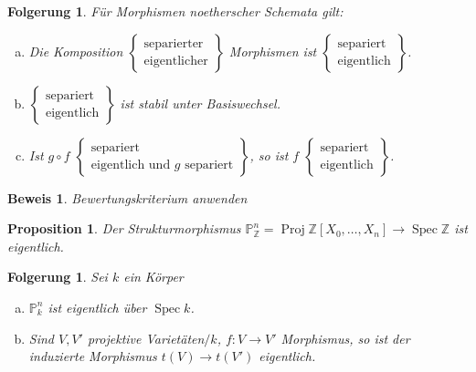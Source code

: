 \documentclass[paper = A4, fontsize=12pt, numbers=noendperiod, chapterprefix=true]{scrbook}
\theoremstyle{break}
\newtheorem{Prop}[Def]{Proposition}
\newtheorem{Folg}[Def]{Folgerung}
\theoremstyle{nonumberbreak}
\newtheorem{bew}{Beweis}
\theoremstyle{nonumberplain}
\DeclareMathOperator{\Proj}{Proj}
\DeclareMathOperator{\Spec}{Spec}
\newcommand{\Z}{\mathbb{Z}}
\newcommand{\IP}{\mathbb{P}}%
\begin{document}
\begin{Folg}\label{8.9}
F\"ur Morphismen noetherscher Schemata gilt:
\begin{enumerate}[a)]
\item\label{8.9a}
	Die Komposition $\left\{\begin{array}{c}\text{separierter}\\ \text{eigentlicher}\end{array}\right\}$ Morphismen ist $\left\{\begin{array}{c}\text{separiert}\\ \text{eigentlich}\end{array}\right\}$.
\item\label{8.9c}
	$\left\{\begin{array}{c}\text{separiert}\\ \text{eigentlich}\end{array}\right\}$ ist stabil unter Basiswechsel.
\item\label{8.9c}
	Ist $g \circ f$ $\left\{\begin{array}{c}\text{separiert}\\ \text{eigentlich und } g \text{ separiert}\end{array}\right\}$, so ist $f$ $\left\{\begin{array}{c}\text{separiert}\\ \text{eigentlich}\end{array}\right\}$.
\end{enumerate}\end{Folg}

\begin{bew}
Bewertungskriterium anwenden
\end{bew}

\begin{Prop}\label{8.10}
Der Strukturmorphismus $\IP_\Z^n = \Proj \Z[X_0,\ldots ,X_n] \to \Spec \Z$ ist eigentlich.
\end{Prop}

\begin{Folg}
Sei $k$ ein K\"orper
\begin{enumerate}[a)]
\item
	$\IP_k^n$ ist eigentlich \"uber $\Spec k$.
\item
	Sind $V, V'$ projektive Variet\"aten$/k$, $f: V \to V'$ Morphismus, so ist der induzierte Morphismus $t(V) \to t(V')$ eigentlich.
\end{enumerate}\end{Folg}
\end{document}
